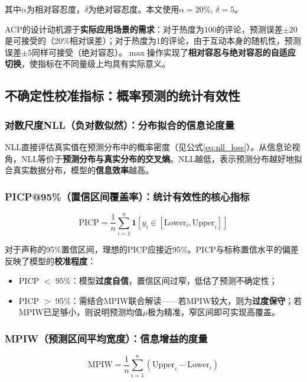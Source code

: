 \documentclass[10pt]{article}
\begin{document}
其中$\alpha$为相对容忍度，$\delta$为绝对容忍度。本文使用$\alpha = 20\%$, $\delta = 5$。

ACP的设计动机源于\textbf{实际应用场景的需求}：对于热度为100的评论，预测误差$\pm 20$是可接受的（20\%相对误差）；对于热度为1的评论，由于互动本身的随机性，预测误差$\pm 5$同样可接受（绝对容忍）。$\max$操作实现了\textbf{相对容忍与绝对容忍的自适应切换}，使指标在不同量级上均具有实际意义。

\subsection{不确定性校准指标：概率预测的统计有效性}

\subsubsection{对数尺度NLL（负对数似然）：分布拟合的信息论度量}

NLL直接评估真实值在预测分布中的概率密度（见公式\ref{eq:nll_loss}）。从信息论视角，NLL等价于\textbf{预测分布与真实分布的交叉熵}。NLL越低，表示预测分布越好地拟合真实数据分布，模型的\textbf{信息效率}越高。

\subsubsection{PICP@95\%（置信区间覆盖率）：统计有效性的核心指标}

\begin{equation}
\text{PICP} = \frac{1}{n}\sum_{i=1}^{n}\mathbf{1}[y_i \in [\text{Lower}_i, \text{Upper}_i]]
\end{equation}

对于声称的95\%置信区间，理想的PICP应接近95\%。PICP与标称置信水平的偏差反映了模型的\textbf{校准程度}：
\begin{itemize}[leftmargin=*]
    \item PICP $<$ 95\%：模型\textbf{过度自信}，置信区间过窄，低估了预测不确定性；
    \item PICP $>$ 95\%：需结合MPIW联合解读——若MPIW较大，则为\textbf{过度保守}；若MPIW已足够小，则说明预测均值$\mu$极为精准，窄区间即可实现高覆盖。
\end{itemize}

\subsubsection{MPIW（预测区间平均宽度）：信息增益的度量}

\begin{equation}
\text{MPIW} = \frac{1}{n} \sum_{i=1}^{n} (\text{Upper}_i - \text{Lower}_i)
\end{equation}
\end{document}
